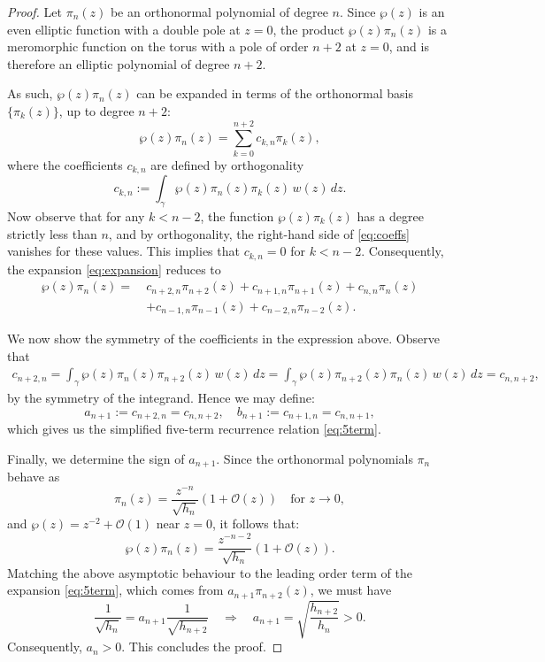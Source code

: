 \documentclass[11pt,a4paper]{article}
\theoremstyle{definition}
\numberwithin{equation}{section}
\numberwithin{theorem}{section}
\begin{document}
\begin{proof}
Let \( \pi_n(z) \) be an orthonormal polynomial of degree \( n \). Since \( \wp(z) \) is an even elliptic function with a double pole at \( z = 0 \), the product \( \wp(z)\pi_n(z) \) is a meromorphic function on the torus with a pole of order \(n+ 2 \) at \( z = 0 \), and is therefore an elliptic polynomial of degree \( n + 2 \).

As such, \( \wp(z)\pi_n(z) \) can be expanded in terms of the orthonormal basis \( \{ \pi_k(z) \} \), up to degree \( n+2 \):
\begin{equation}\label{eq:expansion}
    \wp(z)\pi_n(z) = \sum_{k=0}^{n+2} c_{k,n} \pi_k(z),
\end{equation}
where the coefficients \( c_{k,n} \) are defined by orthogonality
\begin{equation}\label{eq:coeffs}
    c_{k,n}  := \int_{\gamma} \wp(z)\pi_n(z)\pi_k(z) \, w(z)\, dz.
\end{equation}
Now observe that for any \( k < n - 2 \), the function \( \wp(z)\pi_k(z) \) has a degree strictly less than \( n \), and by orthogonality, the right-hand side of \eqref{eq:coeffs} vanishes for these values. This implies that \( c_{k,n} = 0 \) for \( k < n - 2 \). Consequently, the expansion \eqref{eq:expansion} reduces to
\begin{equation}\label{eq:5term-expanded}
\begin{aligned}
    \wp(z)\pi_n(z) =\ & c_{n+2,n}\pi_{n+2}(z) + c_{n+1,n}\pi_{n+1}(z) + c_{n,n}\pi_n(z) \\
    &+ c_{n-1,n}\pi_{n-1}(z) + c_{n-2,n}\pi_{n-2}(z).
\end{aligned}
\end{equation}

We now show the symmetry of the coefficients in the expression above. Observe that
\begin{align}
    c_{n+2,n} = \int_{\gamma} \wp(z)\pi_n(z)\pi_{n+2}(z)\, w(z)\, dz = \int_{\gamma} \wp(z)\pi_{n+2}(z)\pi_n(z)\, w(z)\, dz = c_{n,n+2},
\end{align}
by the symmetry of the integrand. Hence we may define:
\[
    a_{n+1} := c_{n+2,n} = c_{n,n+2}, \quad b_{n+1} := c_{n+1,n} = c_{n,n+1},
\]
which gives us the simplified five-term recurrence relation \eqref{eq:5term}.

Finally, we determine the sign of \( a_{n+1} \). Since the orthonormal polynomials \( \pi_n \) behave as
\[
    \pi_n(z) = \frac{z^{-n}}{\sqrt{h_n}}(1 + \mathcal{O}(z)) \quad \text{for } z \to 0,
\]
and \( \wp(z) = z^{-2} + \mathcal{O}(1) \) near \( z = 0 \), it follows that:
\[
    \wp(z)\pi_n(z) = \frac{z^{-n-2}}{\sqrt{h_n}}(1 + \mathcal{O}(z)).
\]
Matching the above asymptotic behaviour to the leading order term of the expansion \eqref{eq:5term}, which comes from \( a_{n+1}\pi_{n+2}(z) \), we must have
\[
    \frac{1}{\sqrt{h_n}} = a_{n+1} \frac{1}{\sqrt{h_{n+2}}} \quad \Rightarrow \quad a_{n+1} = \sqrt{\frac{h_{n+2}}{h_n}} > 0.
\]
Consequently, $a_n>0$. This concludes the proof.
\end{proof}
\end{document}
